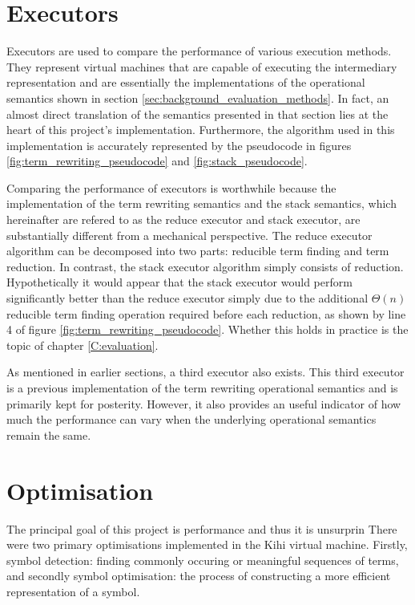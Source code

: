 


\section{Executors}\label{sec:implementation_executors}
Executors are used to compare the performance of various execution methods.
They represent virtual machines that are capable of executing the intermediary representation and are essentially the implementations of the operational semantics shown in section \ref{sec:background_evaluation_methods}. In fact, an almost direct translation of the semantics presented in that section lies at the heart of this project's implementation. Furthermore, the algorithm used in this implementation is accurately represented by the pseudocode in figures \ref{fig:term_rewriting_pseudocode} and \ref{fig:stack_pseudocode}. 

Comparing the performance of executors is worthwhile because the implementation of the term rewriting semantics and the stack semantics, which hereinafter are refered to as the reduce executor and stack executor, are substantially different from a mechanical perspective. The reduce executor algorithm can be decomposed into two parts: reducible term finding and term reduction. In contrast, the stack executor algorithm simply consists of reduction.  Hypothetically it would appear that the stack executor would perform significantly better than the reduce executor simply due to the additional $\Theta(n)$ reducible term finding operation required before each reduction, as shown by line 4 of figure \ref{fig:term_rewriting_pseudocode}. Whether this holds in practice is the topic of chapter \ref{C:evaluation}.

As mentioned in earlier sections, a third executor also exists. This third executor is a previous implementation of the term rewriting operational semantics and is primarily kept for posterity. However, it also provides an useful indicator of how much the performance can vary when the underlying operational semantics remain the same.


\section{Optimisation}\label{sec:implementation_optimisation}
The principal goal of this project is performance and thus it is unsurprin
There were two primary optimisations implemented in the Kihi virtual
machine. Firstly, symbol detection: finding commonly occuring or
meaningful sequences of terms, and secondly symbol optimisation: the
process of constructing a more efficient representation of a symbol.

